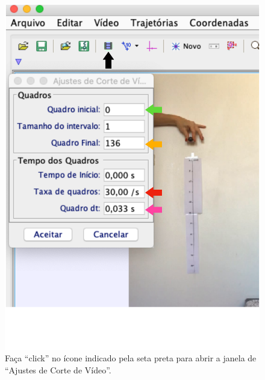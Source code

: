   \begin{minipage}{\linewidth}
  \centering
  \begin{minipage}{0.4\linewidth}
          \begin{figure}[H]
              \includegraphics[width=\linewidth]{Figuras_exp3/fig3AppB.pdf}
\caption{\label{fig3AppB} Faça ``click'' no ícone indicado pela seta preta para abrir a janela de 
``Ajustes de Corte de Vídeo''.}
          \end{figure}
      \end{minipage}
      \hspace{0.01\linewidth}
      \begin{minipage}{0.43\linewidth}
          \begin{figure}[H]

\end{figure}
\end{minipage}
\end{minipage}

